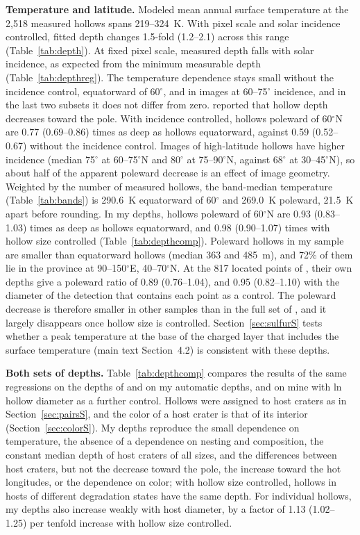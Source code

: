 \documentclass{planetary}
\begin{document}
\textbf{Temperature and latitude.} Modeled mean annual surface temperature at the 2,518 measured hollows spans 219--324~K. With pixel scale and solar incidence controlled, fitted depth changes 1.5-fold (1.2--2.1) across this range (Table~\ref{tab:depth}). At fixed pixel scale, measured depth falls with solar incidence, as expected from the minimum measurable depth (Table~\ref{tab:depthreg}). The temperature dependence stays small without the incidence control, equatorward of 60$^\circ$, and in images at 60--75$^\circ$ incidence, and in the last two subsets it does not differ from zero. \textcite{phillips2021} reported that hollow depth decreases toward the pole. With incidence controlled, hollows poleward of 60$^\circ$N are 0.77 (0.69--0.86) times as deep as hollows equatorward, against 0.59 (0.52--0.67) without the incidence control. Images of high-latitude hollows have higher incidence (median 75$^\circ$ at 60--75$^\circ$N and 80$^\circ$ at 75--90$^\circ$N, against 68$^\circ$ at 30--45$^\circ$N), so about half of the apparent poleward decrease is an effect of image geometry. Weighted by the number of measured hollows, the band-median temperature (Table~\ref{tab:bands}) is 290.6~K equatorward of 60$^\circ$ and 269.0~K poleward, 21.5~K apart before rounding. In my depths, hollows poleward of 60$^\circ$N are 0.93 (0.83--1.03) times as deep as hollows equatorward, and 0.98 (0.90--1.07) times with hollow size controlled (Table~\ref{tab:depthcomp}). Poleward hollows in my sample are smaller than equatorward hollows (median 363 and 485~m), and 72\% of them lie in the province at 90--150$^\circ$E, 40--70$^\circ$N. At the 817 located points of \textcite{blewett2016}, their own depths give a poleward ratio of 0.89 (0.76--1.04), and 0.95 (0.82--1.10) with the diameter of the detection that contains each point as a control. The poleward decrease is therefore smaller in other samples than in the full set of \textcite{blewett2016}, and it largely disappears once hollow size is controlled. Section~\ref{sec:sulfurS} tests whether a peak temperature at the base of the charged layer that includes the surface temperature (main text Section~4.2) is consistent with these depths.

\textbf{Both sets of depths.} Table~\ref{tab:depthcomp} compares the results of the same regressions on the depths of \textcite{blewett2016} and on my automatic depths, and on mine with ln hollow diameter as a further control. Hollows were assigned to host craters as in Section~\ref{sec:pairsS}, and the color of a host crater is that of its interior (Section~\ref{sec:colorS}). My depths reproduce the small dependence on temperature, the absence of a dependence on nesting and composition, the constant median depth of host craters of all sizes, and the differences between host craters, but not the decrease toward the pole, the increase toward the hot longitudes, or the dependence on color; with hollow size controlled, hollows in hosts of different degradation states have the same depth. For individual hollows, my depths also increase weakly with host diameter, by a factor of 1.13 (1.02--1.25) per tenfold increase with hollow size controlled.
\end{document}
